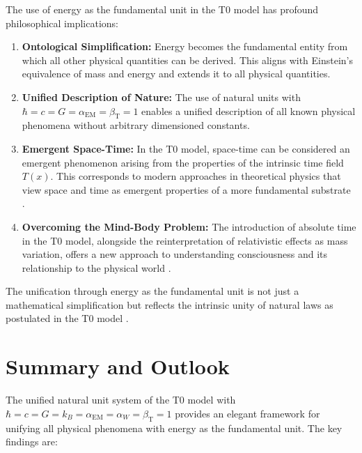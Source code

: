 \documentclass[12pt,a4paper]{article}
\newcommand{\Tfield}{T(x)}
\newcommand{\alphaEM}{\alpha_{\text{EM}}}
\newcommand{\betaT}{\beta_{\text{T}}}
\begin{document}
	The use of energy as the fundamental unit in the T0 model has profound philosophical implications:
	
	\begin{enumerate}
		\item \textbf{Ontological Simplification:} Energy becomes the fundamental entity from which all other physical quantities can be derived. This aligns with Einstein’s equivalence of mass and energy and extends it to all physical quantities.
		
		\item \textbf{Unified Description of Nature:} The use of natural units with $\hbar = c = G = \alphaEM = \betaT = 1$ enables a unified description of all known physical phenomena without arbitrary dimensioned constants.
		
		\item \textbf{Emergent Space-Time:} In the T0 model, space-time can be considered an emergent phenomenon arising from the properties of the intrinsic time field $\Tfield$. This corresponds to modern approaches in theoretical physics that view space and time as emergent properties of a more fundamental substrate \cite{pascher_perspective_2025, pascher_zeit_2025}.
		
		\item \textbf{Overcoming the Mind-Body Problem:} The introduction of absolute time in the T0 model, alongside the reinterpretation of relativistic effects as mass variation, offers a new approach to understanding consciousness and its relationship to the physical world \cite{pascher_perspective_2025}.
	\end{enumerate}
	
	The unification through energy as the fundamental unit is not just a mathematical simplification but reflects the intrinsic unity of natural laws as postulated in the T0 model \cite{pascher_dualismus_2025}.
	
	\section{Summary and Outlook}
	
	The unified natural unit system of the T0 model with $\hbar = c = G = k_B = \alphaEM = \alpha_W = \betaT = 1$ provides an elegant framework for unifying all physical phenomena with energy as the fundamental unit. The key findings are:
	
\end{document}
